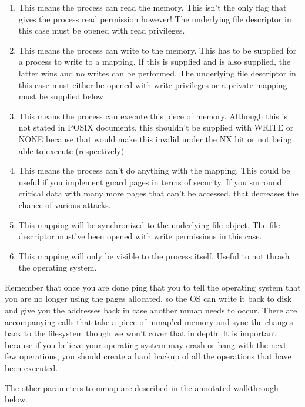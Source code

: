 \begin{enumerate}
\item {} This means the process can read the memory. This isn't the only flag that gives the process read permission however! The underlying file descriptor in this case must be opened with read privileges.
\item {} This means the process can write to the memory. This has to be supplied for a process to write to a mapping. If this is supplied and  is also supplied, the latter wins and no writes can be performed. The underlying file descriptor in this case must either be opened with write privileges or a private mapping must be supplied below
\item {} This means the process can execute this piece of memory. Although this is not stated in POSIX documents, this shouldn't be supplied with WRITE or NONE because that would make this invalid under the NX bit or not being able to execute (respectively)
\item {} This means the process can't do anything with the mapping. This could be useful if you implement guard pages in terms of security. If you surround critical data with many more pages that can't be accessed, that decreases the chance of various attacks.
\item {} This mapping will be synchronized to the underlying file object. The file descriptor must've been opened with write permissions in this case.
\item {} This mapping will only be visible to the process itself. Useful to not thrash the operating system.
\end{enumerate}

Remember that once you are done ping that you  to tell the operating system that you are no longer using the pages allocated, so the OS can write it back to disk and give you the addresses back in case another mmap needs to occur.
There are accompanying calls  that take a piece of mmap'ed memory and sync the changes back to the filesystem though we won't cover that in depth. It is important because if you believe your operating system may crash or hang with the next few operations, you should create a hard backup of all the operations that have been executed.

The other parameters to mmap are described in the annotated walkthrough below.

